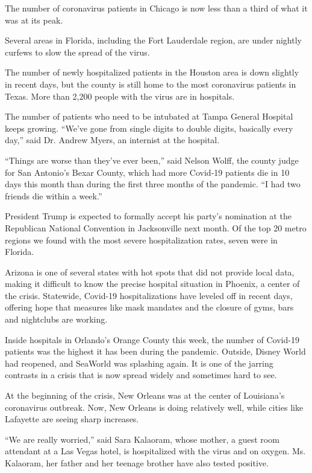 The number of coronavirus patients in Chicago is now less than a third
of what it was at its peak.

Several areas in Florida, including the Fort Lauderdale region, are
under nightly curfews to slow the spread of the virus.

The number of newly hospitalized patients in the Houston area is down
slightly in recent days, but the county is still home to the most
coronavirus patients in Texas. More than 2,200 people with the virus are
in hospitals.

The number of patients who need to be intubated at Tampa General
Hospital keeps growing. ``We've gone from single digits to double
digits, basically every day,'' said Dr. Andrew Myers, an internist at
the hospital.

``Things are worse than they've ever been,'' said Nelson Wolff, the
county judge for San Antonio's Bexar County, which had more Covid-19
patients die in 10 days this month than during the first three months of
the pandemic. ``I had two friends die within a week.''

President Trump is expected to formally accept his party's nomination at
the Republican National Convention in Jacksonville next month. Of the
top 20 metro regions we found with the most severe hospitalization
rates, seven were in Florida.

Arizona is one of several states with hot spots that did not provide
local data, making it difficult to know the precise hospital situation
in Phoenix, a center of the crisis. Statewide, Covid-19 hospitalizations
have leveled off in recent days, offering hope that measures like mask
mandates and the closure of gyms, bars and nightclubs are working.

Inside hospitals in Orlando's Orange County this week, the number of
Covid-19 patients was the highest it has been during the pandemic.
Outside, Disney World had reopened, and SeaWorld was splashing again. It
is one of the jarring contrasts in a crisis that is now spread widely
and sometimes hard to see.

At the beginning of the crisis, New Orleans was at the center of
Louisiana's coronavirus outbreak. Now, New Orleans is doing relatively
well, while cities like Lafayette are seeing sharp increases.

``We are really worried,'' said Sara Kalaoram, whose mother, a guest
room attendant at a Las Vegas hotel, is hospitalized with the virus and
on oxygen. Ms. Kalaoram, her father and her teenage brother have also
tested positive.

